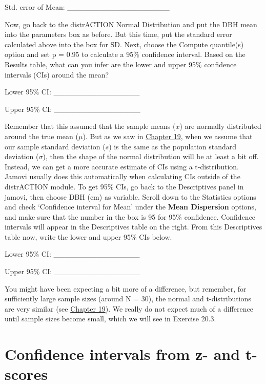 \documentclass[
  openany]{scrbook}
\begin{document}
Std. error of Mean: \_\_\_\_\_\_\_\_\_\_\_\_\_\_\_\_\_\_\_

Now, go back to the distrACTION Normal Distribution and put the DBH mean into the parameters box as before.
But this time, put the standard error calculated above into the box for SD.
Next, choose the Compute quantile(s) option and set p = 0.95 to calculate a 95\% confidence interval.
Based on the Results table, what can you infer are the lower and upper 95\% confidence intervals (CIs) around the mean?

Lower 95\% CI: \_\_\_\_\_\_\_\_\_\_\_\_\_\_\_\_

Upper 95\% CI: \_\_\_\_\_\_\_\_\_\_\_\_\_\_\_\_

Remember that this assumed that the sample means (\(\bar{x}\)) are normally distributed around the true mean (\(\mu\)).
But as we saw in \protect\hyperlink{Chapter_19}{Chapter 19}, when we assume that our sample standard deviation (\(s\)) is the same as the population standard deviation (\(\sigma\)), then the shape of the normal distribution will be at least a bit off.
Instead, we can get a more accurate estimate of CIs using a t-distribution.
Jamovi usually does this automatically when calculating CIs outside of the distrACTION module.
To get 95\% CIs, go back to the Descriptives panel in jamovi, then choose DBH (cm) as variable.
Scroll down to the Statistics options and check `Confidence interval for Mean' under the \textbf{Mean Dispersion} options, and make sure that the number in the box is 95 for 95\% confidence.
Confidence intervals will appear in the Descriptives table on the right.
From this Descriptives table now, write the lower and upper 95\% CIs below.

Lower 95\% CI: \_\_\_\_\_\_\_\_\_\_\_\_\_\_\_\_

Upper 95\% CI: \_\_\_\_\_\_\_\_\_\_\_\_\_\_\_\_

You might have been expecting a bit more of a difference, but remember, for sufficiently large sample sizes (around N = 30), the normal and t-distributions are very similar (see \protect\hyperlink{Chapter_19}{Chapter 19}).
We really do not expect much of a difference until sample sizes become small, which we will see in Exercise 20.3.

\hypertarget{confidence-intervals-from-z--and-t-scores}{%
\section{Confidence intervals from z- and t-scores}\label{confidence-intervals-from-z--and-t-scores}}
\end{document}
